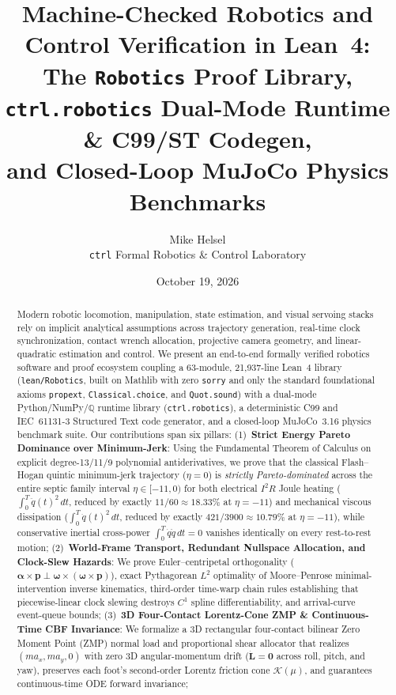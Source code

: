 \documentclass[10pt,twocolumn]{article}
\title{\textbf{Machine-Checked Robotics and Control Verification in Lean~4:\\
The \texttt{Robotics} Proof Library, \texttt{ctrl.robotics} Dual-Mode Runtime \& C99/ST Codegen,\\
and Closed-Loop MuJoCo Physics Benchmarks}}
\author{Mike Helsel\\
\small \texttt{ctrl} Formal Robotics \& Control Laboratory}
\date{October 19, 2026}
\theoremstyle{definition}
\begin{document}
\maketitle

\begin{abstract}
Modern robotic locomotion, manipulation, state estimation, and visual servoing stacks rely on implicit analytical assumptions across trajectory generation, real-time clock synchronization, contact wrench allocation, projective camera geometry, and linear-quadratic estimation and control. We present an end-to-end formally verified robotics software and proof ecosystem coupling a 63-module, 21,937-line Lean~4 library (\texttt{lean/Robotics}, built on Mathlib with zero \texttt{sorry} and only the standard foundational axioms \texttt{propext}, \texttt{Classical.choice}, and \texttt{Quot.sound}) with a dual-mode Python/NumPy/$\mathbb{Q}$ runtime library (\texttt{ctrl.robotics}), a deterministic C99 and IEC~61131-3 Structured Text code generator, and a closed-loop MuJoCo~3.16 physics benchmark suite. Our contributions span six pillars:
(1)~\textbf{Strict Energy Pareto Dominance over Minimum-Jerk}: Using the Fundamental Theorem of Calculus on explicit degree-13/11/9 polynomial antiderivatives, we prove that the classical Flash--Hogan quintic minimum-jerk trajectory ($\eta = 0$) is \emph{strictly Pareto-dominated} across the entire septic family interval $\eta \in [-11, 0)$ for both electrical $I^2R$ Joule heating ($\int_0^T \ddot{q}(t)^2\,dt$, reduced by exactly $11/60 \approx 18.33\%$ at $\eta = -11$) and mechanical viscous dissipation ($\int_0^T \dot{q}(t)^2\,dt$, reduced by exactly $421/3900 \approx 10.79\%$ at $\eta = -11$), while conservative inertial cross-power $\int_0^T \dot{q}\ddot{q}\,dt = 0$ vanishes identically on every rest-to-rest motion;
(2)~\textbf{World-Frame Transport, Redundant Nullspace Allocation, and Clock-Slew Hazards}: We prove Euler--centripetal orthogonality ($\boldsymbol{\alpha}\times\mathbf{p} \perp \boldsymbol{\omega}\times(\boldsymbol{\omega}\times\mathbf{p})$), exact Pythagorean $L^2$ optimality of Moore--Penrose minimal-intervention inverse kinematics, third-order time-warp chain rules establishing that piecewise-linear clock slewing destroys $C^1$ spline differentiability, and arrival-curve event-queue bounds;
(3)~\textbf{3D Four-Contact Lorentz-Cone ZMP \& Continuous-Time CBF Invariance}: We formalize a 3D rectangular four-contact bilinear Zero Moment Point (ZMP) normal load and proportional shear allocator that realizes $(m a_x, m a_y, 0)$ with zero 3D angular-momentum drift ($\dot{\mathbf{L}} = \mathbf{0}$ across roll, pitch, and yaw), preserves each foot's second-order Lorentz friction cone $\mathcal{K}(\mu)$, and guarantees continuous-time ODE forward invariance;

\end{abstract}
\end{document}
